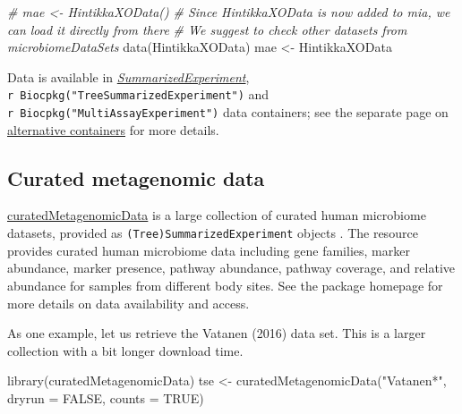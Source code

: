 \documentclass[
]{book}
\newenvironment{Shaded}{\begin{snugshade}}{\end{snugshade}}
\newcommand{\AttributeTok}[1]{\textcolor[rgb]{0.77,0.63,0.00}{#1}}
\newcommand{\CommentTok}[1]{\textcolor[rgb]{0.56,0.35,0.01}{\textit{#1}}}
\newcommand{\ConstantTok}[1]{\textcolor[rgb]{0.00,0.00,0.00}{#1}}
\newcommand{\FunctionTok}[1]{\textcolor[rgb]{0.00,0.00,0.00}{#1}}
\newcommand{\NormalTok}[1]{#1}
\newcommand{\OtherTok}[1]{\textcolor[rgb]{0.56,0.35,0.01}{#1}}
\newcommand{\StringTok}[1]{\textcolor[rgb]{0.31,0.60,0.02}{#1}}
\begin{document}
\begin{Shaded}
\begin{Highlighting}[]
\CommentTok{\# mae \textless{}{-} HintikkaXOData()}
\CommentTok{\# Since HintikkaXOData is now added to mia, we can load it directly from there}
\CommentTok{\# We suggest to check other datasets from microbiomeDataSets}
\FunctionTok{data}\NormalTok{(HintikkaXOData)}
\NormalTok{mae }\OtherTok{\textless{}{-}}\NormalTok{ HintikkaXOData}
\end{Highlighting}
\end{Shaded}

Data is available in \emph{\href{https://bioconductor.org/packages/3.17/SummarizedExperiment}{SummarizedExperiment}}, \texttt{r\ Biocpkg("TreeSummarizedExperiment")} and \texttt{r\ Biocpkg("MultiAssayExperiment")} data containers; see the separate
page on \href{https://microbiome.github.io/OMA/multitable.html}{alternative
containers} for more
details.

\hypertarget{curated-metagenomic-data}{%
\subsection{Curated metagenomic data}\label{curated-metagenomic-data}}

\href{https://bioconductor.org/packages/release/data/experiment/html/curatedMetagenomicData.html}{curatedMetagenomicData}
is a large collection of curated human microbiome datasets, provided as
\texttt{(Tree)SummarizedExperiment} objects \citep{Pasolli2017}. The resource
provides curated human microbiome data including gene families, marker
abundance, marker presence, pathway abundance, pathway coverage, and
relative abundance for samples from different body sites. See the
package homepage for more details on data availability and access.

As one example, let us retrieve the Vatanen (2016) \citep{Vatanen2016} data
set. This is a larger collection with a bit longer download time.

\begin{Shaded}
\begin{Highlighting}[]
\FunctionTok{library}\NormalTok{(curatedMetagenomicData)}
\NormalTok{tse }\OtherTok{\textless{}{-}} \FunctionTok{curatedMetagenomicData}\NormalTok{(}\StringTok{"Vatanen*"}\NormalTok{, }\AttributeTok{dryrun =} \ConstantTok{FALSE}\NormalTok{, }\AttributeTok{counts =} \ConstantTok{TRUE}\NormalTok{)}
\end{Highlighting}
\end{Shaded}
\end{document}
